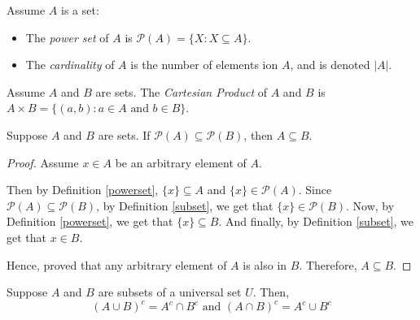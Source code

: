 \begin{definition}\label{powerset}\label{cardinality}
	Assume $A$ is a set:
	\begin{itemize}
		\item The \emph{power set} of $A$ is $\mathcal{P}(A) = \{ X : X \subseteq A \}$.
		\item The \emph{cardinality} of $A$ is the number of elements ion $A$, and is denoted $|A|$.
	\end{itemize}
\end{definition}


\begin{definition}
	Assume $A$ and $B$ are sets. The \emph{Cartesian Product} of $A$ and $B$ is $A \times B = \{(a, b) : a \in A \text{ and } b \in B \}$.
\end{definition}

\begin{proposition}
	Suppose $A$ and $B$ are sets. If $\mathcal{P}(A) \subseteq \mathcal{P}(B)$, then $A \subseteq B$.
\end{proposition}
\begin{proof}
	Assume $x \in A$ be an arbitrary element of $A$.

	Then by Definition \ref{powerset}, $\{ x \} \subseteq A$ and $\{ x \} \in \mathcal{P}(A)$. 
	Since $\mathcal{P}(A) \subseteq \mathcal{P}(B)$, by Definition \ref{subset}, we get that $\{ x \} \in \mathcal{P}(B)$. 
	Now, by Definition \ref{powerset}, we get that $\{ x \} \subseteq B$.
	And finally, by Definition \ref{subset}, we get that $x \in B$.

	Hence, proved that any arbitrary element of $A$ is also in $B$. Therefore, $A \subseteq B$.
\end{proof}


\begin{theorem}
	Suppose $A$ and $B$ are subsets of a universal set $U$. Then, 
	$$(A \cup B)^c = A^c \cap B^c \text{ and } (A \cap B)^c = A^c \cup B^c$$
\end{theorem}

